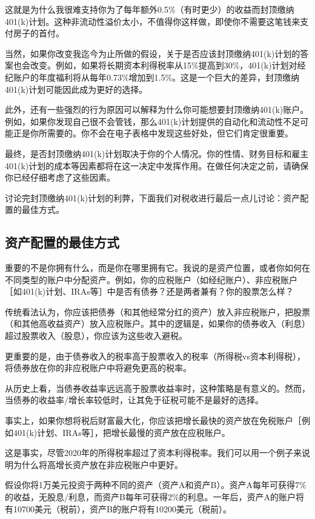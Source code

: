 这就是为什么我很难支持你为了每年额外0.5\%（有时更少）的收益而封顶缴纳401(k)计划。这种非流动性溢价太小，不值得你这样做，即使你不需要这笔钱来支付房子的首付。

当然，如果你改变我迄今为止所做的假设，关于是否应该封顶缴纳401(k)计划的答案也会改变。例如，如果将长期资本利得税率从15\%提高到30\%，401(k)计划对经纪账户的年度福利将从每年0.73\%增加到1.5\%。这是一个巨大的差异，封顶缴纳401(k)计划可能因此成为更好的选择。

此外，还有一些强烈的行为原因可以解释为什么你可能想要封顶缴纳401(k)账户。例如，如果你发现自己很不会管钱，那么401(k)计划提供的自动化和流动性不足可能正是你所需要的。你不会在电子表格中发现这些好处，但它们肯定很重要。

最终，是否封顶缴纳401(k)计划取决于你的个人情况。你的性情、财务目标和雇主401(k)计划的成本等因素都将在这一决定中发挥作用。在做任何决定之前，请确保你已经仔细考虑了这些因素。

讨论完封顶缴纳401(k)计划的利弊，下面我们对税收进行最后一点儿讨论：资产配置的最佳方式。

\subsection{资产配置的最佳方式}

重要的不是你拥有什么，而是你在哪里拥有它。我说的是资产位置，或者你如何在不同类型的账户中分配资产。例如，你的应税账户（如经纪账户）、非应税账户［如401(k)计划、IRAs等］中是否有债券？还是两者兼有？你的股票怎么样？

传统看法认为，你应该把债券（和其他经常分红的资产）放入非应税账户，把股票（和其他高收益资产）放入应税账户。其中的逻辑是，如果你的债券收入（利息）超过股票收入（股息），你应该为这些收入避税。

更重要的是，由于债券收入的税率高于股票收入的税率（所得税vs资本利得税），将债券放在你的非应税账户中将避免更高的税率。

从历史上看，当债券收益率远远高于股票收益率时，这种策略是有意义的。然而，当债券的收益率/增长率较低时，让其免于征税可能不是最好的选择。

事实上，如果你想将税后财富最大化，你应该把增长最快的资产放在免税账户［例如401(k)计划、IRAs等］，把增长最慢的资产放在应税账户。

这是事实，尽管2020年的所得税率超过了资本利得税率。我们可以用一个例子来说明为什么将高增长资产放在非应税账户中更好。

假设你将1万美元投资于两种不同的资产（资产A和资产B）。资产A每年可获得7\%的收益，无股息/利息，而资产B每年可获得2\%的利息。一年后，资产A的账户将有10700美元（税前），资产B的账户将有10200美元（税前）。

